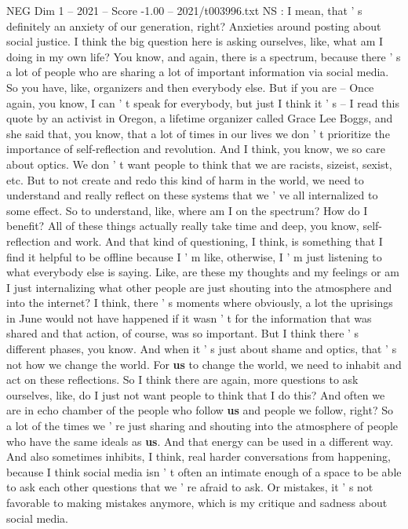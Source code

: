 \begin{textsample}{NEG Dim 1 – 2021 – Score -1.00 – 2021/t003996.txt}
NS : I mean, that ' s definitely an anxiety of our generation, right?
Anxieties around posting about social justice.
I think the big question here is asking ourselves, like, what am I doing in my own life?
You know, and again, there is a spectrum, because there ' s a lot of people who are sharing a lot of important information via social media.
So you have, like, organizers and then everybody else.
But if you are -- Once again, you know, I can ' t speak for everybody, but just I think it ' s -- I read this quote by an activist in Oregon, a lifetime organizer called Grace Lee Boggs, and she said that, you know, that a lot of times in our lives we don ' t prioritize the importance of self-reflection and revolution.
And I think, you know, we so care about optics.
We don ' t want people to think that we are racists, sizeist, sexist, etc.
But to not create and redo this kind of harm in the world, we need to understand and really reflect on these systems that we ' ve all internalized to some effect.
So to understand, like, where am I on the spectrum?
How do I benefit?
All of these things actually really take time and deep, you know, self-reflection and work.
And that kind of questioning, I think, is something that I find it helpful to be offline because I ' m like, otherwise, I ' m just listening to what everybody else is saying.
Like, are these my thoughts and my feelings or am I just internalizing what other people are just shouting into the atmosphere and into the internet?
I think, there ' s moments where obviously, a lot the uprisings in June would not have happened if it wasn ' t for the information that was shared and that action, of course, was so important.
But I think there ' s different phases, you know.
And when it ' s just about shame and optics, that ' s not how we change the world.
For \textbf{us} to change the world, we need to inhabit and act on these reflections.
So I think there are again, more questions to ask ourselves, like, do I just not want people to think that I do this?
And often we are in echo chamber of the people who follow \textbf{us} and people we follow, right?
So a lot of the times we ' re just sharing and shouting into the atmosphere of people who have the same ideals as \textbf{us}.
And that energy can be used in a different way.
And also sometimes inhibits, I think, real harder conversations from happening, because I think social media isn ' t often an intimate enough of a space to be able to ask each other questions that we ' re afraid to ask.
Or mistakes, it ' s not favorable to making mistakes anymore, which is my critique and sadness about social media.

\end{textsample}
